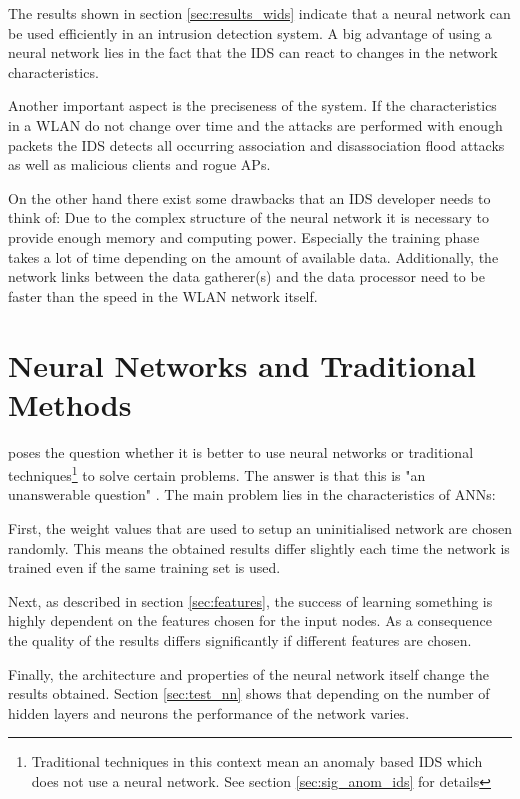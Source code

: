 The results shown in section \ref{sec:results_wids} indicate that a neural network can be used efficiently in an intrusion detection system. A big advantage of using a neural network lies in the fact that the IDS can react to changes in the network characteristics.

Another important aspect is the preciseness of the system. If the characteristics in a WLAN do not change over time and the attacks are performed with enough packets the IDS detects all occurring association and disassociation flood attacks as well as malicious clients and rogue APs.

On the other hand there exist some drawbacks that an IDS developer needs to think of: Due to the complex structure of the neural network it is necessary to provide enough memory and computing power. Especially the training phase takes a lot of time depending on the amount of available data. Additionally, the network links between the data gatherer(s) and the data processor need to be faster than the speed in the WLAN network itself.

\section{Neural Networks and Traditional Methods}

\cite{nn_vs_traditional} poses the question whether it is better to use neural networks or traditional techniques\footnote{Traditional techniques in this context mean an anomaly based IDS which does not use a neural network. See section \ref{sec:sig_anom_ids} for details} to solve certain problems. The answer is that this is "an unanswerable question" \cite[p.4]{nn_vs_traditional}. The main problem lies in the characteristics of ANNs:

First, the weight values that are used to setup an uninitialised network are chosen randomly. This means the obtained results differ slightly each time the network is trained even if the same training set is used.

Next, as described in section \ref{sec:features}, the success of learning something is highly dependent on the features chosen for the input nodes. As a consequence the quality of the results differs significantly if different features are chosen.

Finally, the architecture and properties of the neural network itself change the results obtained. Section \ref{sec:test_nn} shows that depending on the number of hidden layers and neurons the performance of the network varies.

